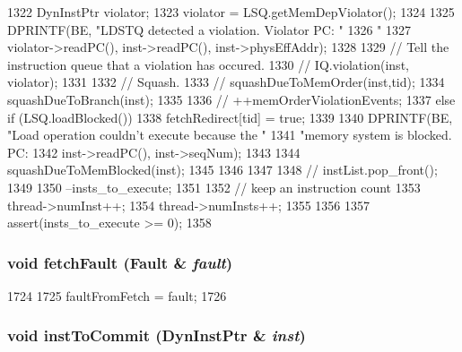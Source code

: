\begin{DoxyCode}
{{{{1322                 DynInstPtr violator;
1323                 violator = LSQ.getMemDepViolator();
1324 
1325                 DPRINTF(BE, "LDSTQ detected a violation.  Violator PC: "
1326                         "%
1327                         violator->readPC(), inst->readPC(), inst->physEffAddr);
1328 
1329                 // Tell the instruction queue that a violation has occured.
1330 //                IQ.violation(inst, violator);
1331 
1332                 // Squash.
1333 //                squashDueToMemOrder(inst,tid);
1334                 squashDueToBranch(inst);
1335 
1336 //                ++memOrderViolationEvents;
1337             } else if (LSQ.loadBlocked()) {
1338                 fetchRedirect[tid] = true;
1339 
1340                 DPRINTF(BE, "Load operation couldn't execute because the "
1341                         "memory system is blocked.  PC: %
1342                         inst->readPC(), inst->seqNum);
1343 
1344                 squashDueToMemBlocked(inst);
1345             }
1346         }
1347 
1348 //        instList.pop_front();
1349 
1350         --insts_to_execute;
1351 
1352         // keep an instruction count
1353         thread->numInst++;
1354         thread->numInsts++;
1355     }
1356 
1357     assert(insts_to_execute >= 0);
1358 }
\end{DoxyCode}
\hypertarget{classBackEnd_a71dcc69e5b01fa12b8ccd2dccdcc9917}{
\subsubsection[{fetchFault}]{\setlength{\rightskip}{0pt plus 5cm}void fetchFault ({\bf Fault} \& {\em fault})}}
\label{classBackEnd_a71dcc69e5b01fa12b8ccd2dccdcc9917}



\begin{DoxyCode}
1724 {
1725     faultFromFetch = fault;
1726 }
\end{DoxyCode}
\hypertarget{classBackEnd_a720e9865ffa6e84b756f5ec1d1a24d94}{
\subsubsection[{instToCommit}]{\setlength{\rightskip}{0pt plus 5cm}void instToCommit ({\bf DynInstPtr} \& {\em inst})}}
\label{classBackEnd_a720e9865ffa6e84b756f5ec1d1a24d94}



